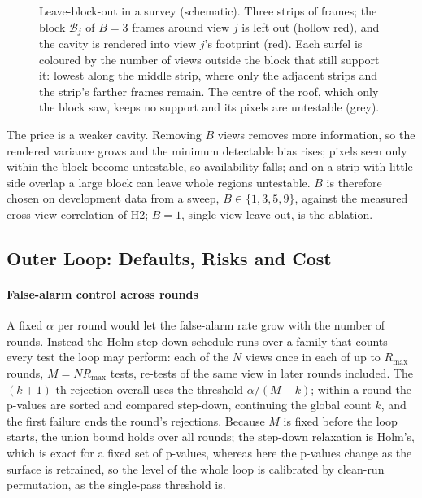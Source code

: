 \begin{figure}[!t]
\centering

\caption{Leave-block-out in a survey (schematic). Three strips of frames; the block $\mathcal{B}_j$ of
$B=3$ frames around view $j$ is left out (hollow red), and the cavity is rendered into view $j$'s footprint
(red). Each surfel is coloured by the number of views outside the block that still support it: lowest
along the middle strip, where only the adjacent strips and the strip's farther frames remain. The centre of
the roof, which only the block saw, keeps no support and its pixels are untestable (grey).}
\label{fig:scene3d}
\end{figure}

The price is a weaker cavity. Removing $B$ views removes more information, so the rendered variance
grows and the minimum detectable bias rises; pixels seen only within the block become untestable, so
availability falls; and on a strip with little side overlap a large block can leave whole regions
untestable. $B$ is therefore chosen on development data from a sweep, $B\in\{1,3,5,9\}$, against the
measured cross-view correlation of H2; $B=1$, single-view leave-out, is the ablation.

\subsection{Outer Loop: Defaults, Risks and Cost}
\paragraph{False-alarm control across rounds}
A fixed $\alpha$ per round would let the false-alarm rate grow with the number of rounds. Instead the
Holm step-down schedule runs over a family that counts every test the loop may perform: each of the
$N$ views once in each of up to $R_{\max}$ rounds, $M=N R_{\max}$ tests, re-tests of the same view in later
rounds included. The $(k{+}1)$-th rejection overall uses the threshold $\alpha/(M-k)$; within a round the
p-values are sorted and compared step-down, continuing the global count $k$, and the first failure
ends the round's rejections. Because $M$ is fixed before the loop starts, the union bound holds over
all rounds; the step-down relaxation is Holm's, which is exact for a fixed set of p-values, whereas
here the p-values change as the surface is retrained, so the level of the whole loop is calibrated by
clean-run permutation, as the single-pass threshold is.
